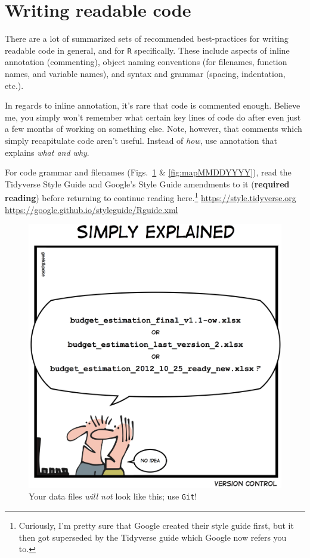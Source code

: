 \documentclass[12pt,letterpaper]{article}
\begin{document}
\section{Writing readable code}

There are a lot of summarized sets of recommended best-practices for writing readable code in general, and for \texttt{R} specifically.
These include aspects of inline annotation (commenting), object naming 
conventions (for filenames, function names, and variable names), and syntax 
and grammar (spacing, indentation, etc.).

In regards to inline annotation, it's rare that code is commented enough.
Believe me, you simply won't remember what certain key lines of code do after even just a few months of working on something else.
Note, however, that comments which simply recapitulate code aren't useful.
Instead of \emph{how}, use annotation that explains \emph{what and why}.

For code grammar and filenames (Figs.~\ref{fig:datafilenames} \& 
\ref{fig:mapMMDDYYYY}), read the Tidyverse Style Guide and Google's 
Style Guide amendments to it (\textbf{required reading}) before returning 
to continue reading here.\footnote{Curiously, I'm pretty sure that Google 
created their style guide first, but it then got superseded by the Tidyverse 
guide which Google now refers you to.}
\url{https://style.tidyverse.org}\\ 
\url{https://google.github.io/styleguide/Rguide.xml}

\begin{figure}[H]
	\centering
	\includegraphics[width=0.6\linewidth]{figs/datafilenames.png}
	\caption{Your data files \emph{will not} look like this; use \texttt{Git}!}
		\label{fig:datafilenames}
\end{figure}
\end{document}
